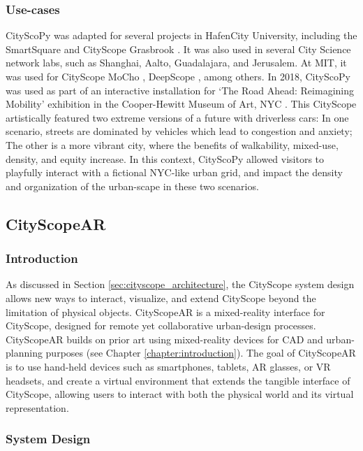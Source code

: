 {{      \subsubsection{Use-cases}
      {
          CityScoPy was adapted for several projects in HafenCity University, including the SmartSquare \cite{bley2020smartsquare} and CityScope Grasbrook \cite{baeza2021cityscope}. It was also used in several City Science network labs, such as Shanghai, Aalto, Guadalajara, and Jerusalem. At MIT, it was used for CityScope MoCho \cite{doorley2019s}, DeepScope \cite{noyman2020deepscope}, among others. In 2018, CityScoPy was used as part of an interactive installation for `The Road Ahead: Reimagining Mobility' exhibition in the Cooper-Hewitt Museum of Art, NYC \cite{CityScop40:online}. This CityScope artistically featured two extreme versions of a future with driverless cars: In one scenario, streets are dominated by vehicles which lead to congestion and anxiety; The other is a more vibrant city, where the benefits of walkability, mixed-use, density, and equity increase. In this context, CityScoPy allowed visitors to playfully interact with a fictional NYC-like urban grid, and impact the density and organization of the urban-scape in these two scenarios.
      }
  }

  \subsection{CityScopeAR}\label{sec:cityscope_ar}
  {
      \subsubsection{Introduction}
      {
          As discussed in Section \eqref{sec:cityscope_architecture}, the CityScope system design allows new ways to interact, visualize, and extend CityScope beyond the limitation of physical objects. CityScopeAR is a mixed-reality interface for CityScope, designed for remote yet collaborative urban-design processes. CityScopeAR builds on prior art using mixed-reality devices for CAD and urban-planning purposes (see Chapter \eqref{chapter:introduction}). The goal of CityScopeAR is to use hand-held devices such as smartphones, tablets, AR glasses, or VR headsets, and create a virtual environment that extends the tangible interface of CityScope, allowing users to interact with both the physical world and its virtual representation.
      }

      \subsubsection{System Design}

}}
